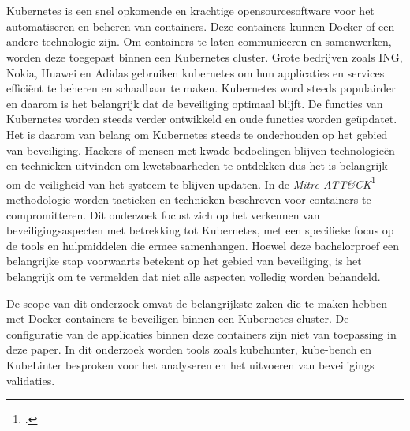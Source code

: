 
\chapter{}%
\label{ch:inleiding}

Kubernetes is een snel opkomende en krachtige opensourcesoftware voor het automatiseren en beheren van containers. Deze containers kunnen Docker of een andere technologie zijn. Om containers te laten communiceren en samenwerken, worden deze toegepast binnen een Kubernetes cluster. \autocite{KubernetesDocs-2023} Grote bedrijven zoals ING, Nokia, Huawei en Adidas gebruiken kubernetes om hun applicaties en services efficiënt te beheren en schaalbaar te maken. Kubernetes word steeds populairder en daarom is het belangrijk dat de beveiliging optimaal blijft. De functies van Kubernetes worden steeds verder ontwikkeld en oude functies worden geüpdatet. Het is daarom van belang om Kubernetes steeds te onderhouden op het gebied van beveiliging.  Hackers of mensen met kwade bedoelingen blijven technologieën en technieken uitvinden om kwetsbaarheden te ontdekken dus het is belangrijk om de veiligheid van het systeem te blijven updaten. In de \textit{Mitre ATT\&CK}\footcite{https://attack.mitre.org/matrices/enterprise/containers/} methodologie worden tactieken en technieken beschreven voor containers te compromitteren.  Dit onderzoek focust zich op het verkennen van beveiligingsaspecten met betrekking tot Kubernetes, met een specifieke focus op de tools en hulpmiddelen die ermee samenhangen. Hoewel deze bachelorproef een belangrijke stap voorwaarts betekent op het gebied van beveiliging, is het belangrijk om te vermelden dat niet alle aspecten volledig worden behandeld. \newline

De scope van dit onderzoek omvat de belangrijkste zaken die te maken hebben met Docker containers te beveiligen binnen een Kubernetes cluster. De configuratie van de applicaties binnen deze containers zijn niet van toepassing in deze paper. In dit onderzoek worden tools zoals kubehunter, kube-bench en KubeLinter besproken voor het analyseren en het uitvoeren van beveiligings validaties. 


